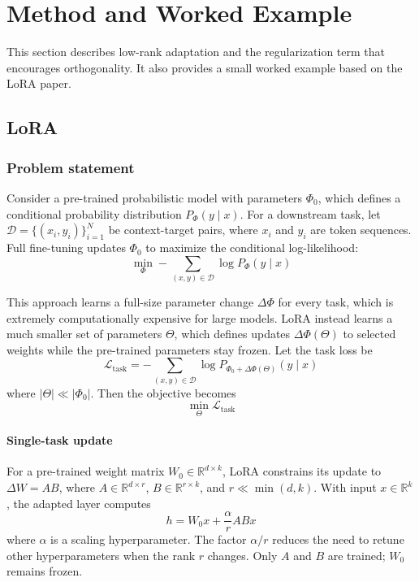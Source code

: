 \section{Method and Worked Example}
This section describes low-rank adaptation and the regularization term that encourages orthogonality. It also provides a small worked example based on the LoRA paper.

\subsection{LoRA}

\subsubsection{Problem statement}

Consider a pre-trained probabilistic model with parameters
\(\Phi_0\), which defines a conditional probability distribution \(P_{\Phi}(y\mid x)\).
For a downstream task, let \(\mathcal{D} = \{(x_i,y_i)\}_{i=1}^{N}\) be context-target pairs, where \(x_i\) and \(y_i\) are token sequences.
Full fine-tuning updates \(\Phi_0\) to maximize the conditional log-likelihood:
\[
	\min_{\Phi}
	- \sum_{(x,y)\in\mathcal{D}}
	\log P_{\Phi}(y \mid x)
\]

This approach learns a full-size parameter change \(\Delta\Phi\) for every task, which is extremely computationally expensive for large models.
LoRA instead learns a much smaller set of parameters \(\Theta\), which defines updates \(\Delta\Phi(\Theta)\) to selected weights while the pre-trained parameters stay frozen.
Let the task loss be
\[
	\mathcal{L}_{\mathrm{task}} =
	- \sum_{(x,y)\in\mathcal{D}}
	\log P_{\Phi_0+\Delta\Phi(\Theta)}(y \mid x)
\]
where \(|\Theta|\ll|\Phi_0|\).
Then the objective becomes
\[
	\min_{\Theta} \mathcal{L}_{\mathrm{task}}
\]

\paragraph{Single-task update}

For a pre-trained weight matrix \(W_0\in\mathbb{R}^{d\times k}\), LoRA constrains its update to \(\Delta W=AB\), where \(A\in\mathbb{R}^{d\times r}\), \(B\in\mathbb{R}^{r\times k}\), and \(r\ll\min(d,k)\). With input \(x\in\mathbb{R}^{k}\), the adapted layer computes
\[
	h=W_0x+\frac{\alpha}{r}ABx
\]
where \(\alpha\) is a scaling hyperparameter.
The factor \(\alpha/r\) reduces the need to retune other hyperparameters when the rank \(r\) changes.
Only \(A\) and \(B\) are trained; \(W_0\) remains frozen.

